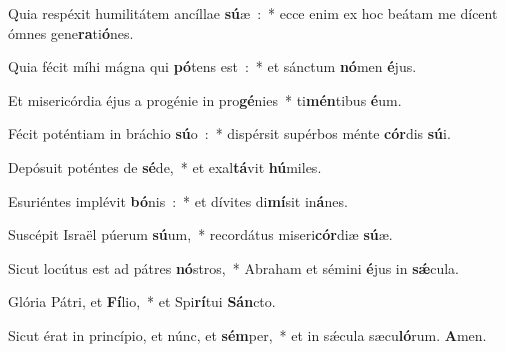 ﻿\item Quia respéxit humilitátem ancíllae \textbf{sú}\-æ~:~* ecce enim ex hoc beátam me dícent ómnes gene\textbf{ra}ti\textbf{ó}nes.
\item Quia fécit míhi mágna qui \textbf{pó}\-tens est~:~* et sánctum \textbf{nó}\-men \textbf{é}jus.
\item Et misericórdia éjus a progénie in pro\textbf{gé}\-nies~* ti\textbf{mén}\-tibus \textbf{é}um.
\item Fécit poténtiam in bráchio \textbf{sú}\-o~:~* dispérsit supérbos ménte \textbf{cór}\-dis \textbf{sú}i.
\item Depósuit poténtes de \textbf{sé}\-de,~* et exal\textbf{tá}\-vit \textbf{hú}miles.
\item Esuriéntes implévit \textbf{bó}\-nis~:~* et dívites di\textbf{mí}\-sit in\textbf{á}nes.
\item Suscépit Israël púerum \textbf{sú}\-um,~* recordátus miseri\textbf{cór}\-diæ \textbf{sú}æ.
\item Sicut locútus est ad pátres \textbf{nó}\-stros,~* Abraham et sémini \textbf{é}\-jus in \textbf{sǽ}cula.
\item Glória Pátri, et \textbf{Fí}\-lio,~* et Spi\textbf{rí}\-tui \textbf{Sán}cto.
\item Sicut érat in princípio, et núnc, et \textbf{sém}\-per,~* et in sǽcula sæcu\textbf{ló}\-rum. \textbf{A}men.
